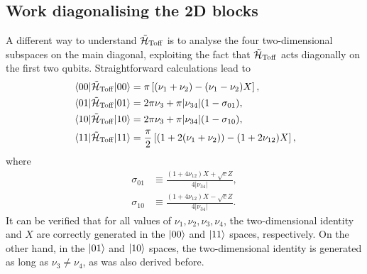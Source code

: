 \subsection{Work diagonalising the 2D blocks}
A different way to understand $\tilde{\mathcal{H}}_{\operatorname{Toff}}$ is to analyse the four two-dimensional subspaces on the main diagonal, exploiting the fact that $\tilde{\mathcal{H}}_{\operatorname{Toff}}{}$ acts diagonally on the first two qubits.
Straightforward calculations lead to
\begin{equation*}
\begin{aligned}
	\mel{00}{\tilde{\mathcal{H}}_{\operatorname{Toff}}}{00} &= \pi \left[(\nu_1+\nu_2)-(\nu_1-\nu_2)X\right], \\
	\mel{01}{\tilde{\mathcal{H}}_{\operatorname{Toff}}}{01} &= 2\pi\nu_3 + \pi\lvert\nu_{34}\rvert(1 - \sigma_{01}), \\
	\mel{10}{\tilde{\mathcal{H}}_{\operatorname{Toff}}}{10} &= 2\pi\nu_3 + \pi\lvert\nu_{34}\rvert(1 - \sigma_{10}), \\
	\mel{11}{\tilde{\mathcal{H}}_{\operatorname{Toff}}}{11} &= \frac{\pi}{2}\left[
		(1+2(\nu_1+\nu_2))-(1+2\nu_{12})X
	\right], \\
\end{aligned}
\end{equation*}
where
\begin{equation}
\begin{aligned}
	\sigma_{01}&\equiv\frac{(1+4\nu_{12})X + \sqrt{c}Z}{4\lvert\nu_{34}\rvert}, \\
	\sigma_{10}&\equiv\frac{(1+4\nu_{12})X - \sqrt{c}Z}{4\lvert\nu_{34}\rvert}.
\end{aligned}
\end{equation}
It can be verified that for all values of $\nu_1, \nu_2, \nu_3, \nu_4$, the two-dimensional identity and $X$ are correctly generated in the $\ket{00}$ and $\ket{11}$ spaces, respectively.
On the other hand, in the $\ket{01}$ and $\ket{10}$ spaces, the two-dimensional identity is generated as long as $\nu_3\neq\nu_4$, as was also derived before.

